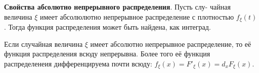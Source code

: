 \textbf{Свойства абсолютно непрерывного распределения}. Пусть слу-
чайная величина $\xi$ имеет абсолюлютно непрерывное распределение с плотностью $f_\xi (t)$. Тогда функция распределения может быть найдена, как интеград. 

\begin{to_lem}
    Если случайная величина $\xi$ имеет абсолютно непрерывное распределение, то её функция распределения всюду непрерывна. Более того её функция распределенеия дифференцируема почти всюду: $f_\xi (x) = F'_\xi (x) = d_x F_\xi (x)$. 
\end{to_lem}



